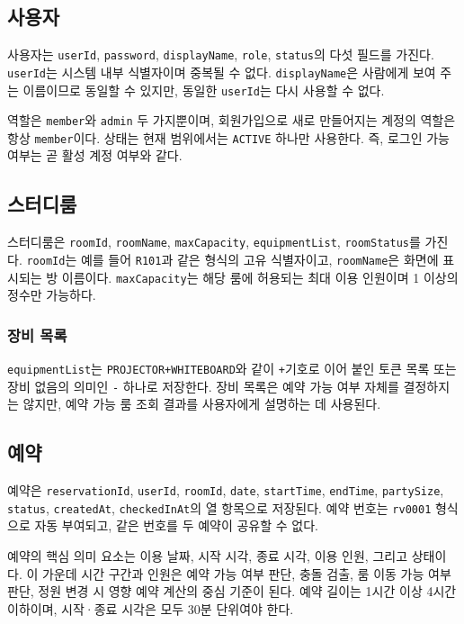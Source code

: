 \documentclass[a4paper,10pt]{article}
\begin{document}
\subsection{사용자}
사용자는 \texttt{userId}, \texttt{password}, \texttt{displayName}, \texttt{role}, \texttt{status}의 다섯 필드를 가진다. \texttt{userId}는 시스템 내부 식별자이며 중복될 수 없다. \texttt{displayName}은 사람에게 보여 주는 이름이므로 동일할 수 있지만, 동일한 \texttt{userId}는 다시 사용할 수 없다.

역할은 \texttt{member}와 \texttt{admin} 두 가지뿐이며, 회원가입으로 새로 만들어지는 계정의 역할은 항상 \texttt{member}이다. 상태는 현재 범위에서는 \texttt{ACTIVE} 하나만 사용한다. 즉, 로그인 가능 여부는 곧 활성 계정 여부와 같다.

\subsection{스터디룸}
스터디룸은 \texttt{roomId}, \texttt{roomName}, \texttt{maxCapacity}, \texttt{equipmentList}, \texttt{roomStatus}를 가진다. \texttt{roomId}는 예를 들어 \texttt{R101}과 같은 형식의 고유 식별자이고, \texttt{roomName}은 화면에 표시되는 방 이름이다. \texttt{maxCapacity}는 해당 룸에 허용되는 최대 이용 인원이며 1 이상의 정수만 가능하다.

\subsubsection{장비 목록}
\texttt{equipmentList}는 \texttt{PROJECTOR+WHITEBOARD}와 같이 \texttt{+}기호로 이어 붙인 토큰 목록 또는 장비 없음의 의미인 \texttt{-} 하나로 저장한다. 장비 목록은 예약 가능 여부 자체를 결정하지는 않지만, 예약 가능 룸 조회 결과를 사용자에게 설명하는 데 사용된다.

\subsection{예약}
예약은 \texttt{reservationId}, \texttt{userId}, \texttt{roomId}, \texttt{date}, \texttt{startTime}, \texttt{endTime}, \texttt{partySize}, \texttt{status}, \texttt{createdAt}, \texttt{checkedInAt}의 열 항목으로 저장된다. 예약 번호는 \texttt{rv0001} 형식으로 자동 부여되고, 같은 번호를 두 예약이 공유할 수 없다.

예약의 핵심 의미 요소는 이용 날짜, 시작 시각, 종료 시각, 이용 인원, 그리고 상태이다. 이 가운데 시간 구간과 인원은 예약 가능 여부 판단, 충돌 검출, 룸 이동 가능 여부 판단, 정원 변경 시 영향 예약 계산의 중심 기준이 된다. 예약 길이는 1시간 이상 4시간 이하이며, 시작·종료 시각은 모두 30분 단위여야 한다.
\end{document}
